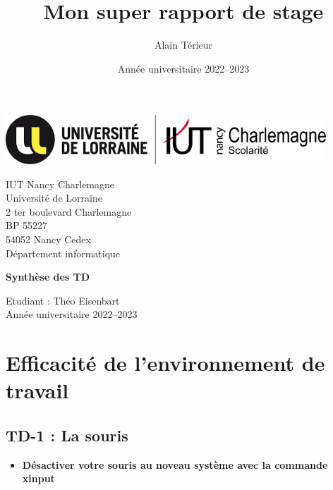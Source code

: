 \documentclass[12pt]{article}
\title{Mon super rapport de stage}
\author{Alain Térieur}
\date{Année universitaire 2022--2023}
\begin{document}
  \thispagestyle{empty}
  \begin{center}
    \includegraphics[width=12cm]{images/Logo_IUT-UL_dept_info.png}
  \end{center}

  \vspace{1cm}

  \noindent
  {\large
    IUT Nancy Charlemagne\\
    Université de Lorraine\\
    2 ter boulevard Charlemagne\\
    BP 55227\\
    54052 Nancy Cedex\\[5mm]
    Département informatique
  }

  \vspace{5cm}

  \begin{center}
    {\huge
      \textbf{Synthèse des TD}
    }
  \end{center}

  \vspace{5cm}

  \vfill

  {\Large
    \noindent
    Etudiant : Théo Eisenbart\\
    Année universitaire 2022--2023
  }
  \newpage
  \thispagestyle{empty}
  \mbox{}
  \newpage

  \newpage
  \tableofcontents

  \newpage

  \section{Efficacité de l'environnement de travail}

    \subsection{TD-1 : La souris}
    \vspace{0.3cm}

  \begin{itemize}
    \item \textbf{Désactiver votre souris au noveau système avec la commande xinput}
  \end{itemize}
\end{document}
